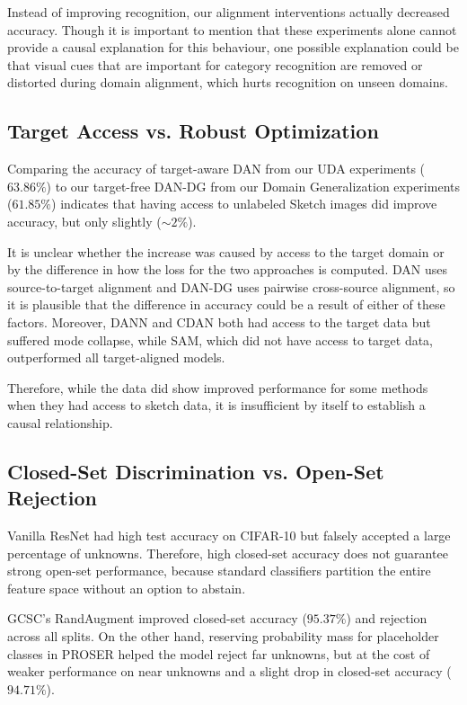 \documentclass{article}
\begin{document}
Instead of improving recognition, our alignment interventions actually decreased accuracy. Though it is important to mention that these experiments alone cannot provide a causal explanation for this behaviour, one possible explanation could be that visual cues that are important for category recognition are removed or distorted during domain alignment, which hurts recognition on unseen domains.


\subsection{Target Access vs. Robust Optimization}
Comparing the accuracy of target-aware DAN from our UDA experiments ($63.86\%$) to our target-free DAN-DG from our Domain Generalization experiments ($61.85\%$) indicates that having access to unlabeled Sketch images did improve accuracy, but only slightly ($\sim 2\%$).

It is unclear whether the increase was caused by access to the target domain or by the difference in how the loss for the two approaches is computed. DAN uses source-to-target alignment and DAN-DG uses pairwise cross-source alignment, so it is plausible that the difference in accuracy could be a result of either of these factors. Moreover, DANN and CDAN both had access to the target data but suffered mode collapse, while SAM, which did not have access to target data, outperformed all target-aligned models. 

Therefore, while the data did show improved performance for some methods when they had access to sketch data, it is insufficient by itself to establish a causal relationship.


\subsection{Closed-Set Discrimination vs. Open-Set Rejection}
Vanilla ResNet had high test accuracy on CIFAR-10 but falsely accepted a large percentage of unknowns. Therefore, high closed-set accuracy does not guarantee strong open-set performance, because standard classifiers partition the entire feature space without an option to abstain.

GCSC's RandAugment improved closed-set accuracy ($95.37\%$) and rejection across all splits. On the other hand, reserving probability mass for placeholder classes in PROSER helped the model reject far unknowns, but at the cost of weaker performance on near unknowns and a slight drop in closed-set accuracy ($94.71\%$).
\end{document}
